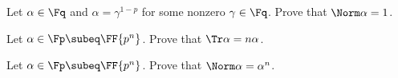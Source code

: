 \documentclass{article}
\begin{document}
\begin{subexercise}
Let \( \alpha\in\Fq \) and \( \alpha=\gamma^{1-p} \) for some nonzero \( \gamma\in\Fq \).
Prove that \( \Norm \alpha = 1 \).
\end{subexercise}
\begin{solution}

\end{solution}
\pagebreak

\begin{subexercise}
  Let \( \alpha\in\Fp \subeq \FF{p^n} \).
  Prove that \( \Tr \alpha = n\alpha \).
\end{subexercise}
\begin{solution}

\end{solution}
\pagebreak

\begin{subexercise}
  Let \( \alpha\in\Fp \subeq \FF{p^n} \).
  Prove that \( \Norm \alpha = \alpha^n \).
\end{subexercise}
\begin{solution}

\end{solution}
\end{document}
